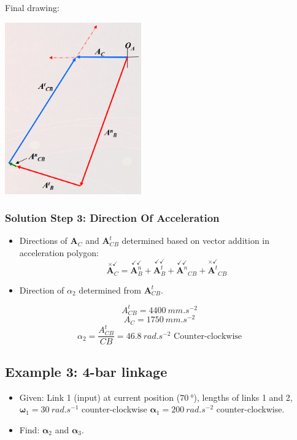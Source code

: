 \documentclass[11pt]{article}
\begin{document}
Final drawing:
\begin{center}
\includegraphics[height=20em]{./images/slider-crank-linkage-graphical-acceleration-analysis-example-2-acceleration-polygon.png}
\end{center}
\subsubsection{Solution Step 3: Direction Of Acceleration}
\label{sec:org64b9114}
\begin{itemize}
\item Directions of \(\boldsymbol{A}_C\) and \(\boldsymbol{A}_{CB}^t\) determined based on vector addition in acceleration polygon:
\[\overset{\times \checkmark}{\boldsymbol{A}_C} = \overset{\checkmark \checkmark}{\boldsymbol{A}_B^n} + \overset{\checkmark \checkmark}{\boldsymbol{A}_B^t} + \overset{\checkmark \checkmark}{\boldsymbol{A}^n}_{CB} + \overset{\times \checkmark}{\boldsymbol{A}^t}_{CB}\]
\item Direction of \(\alpha_2\) determined from \(\boldsymbol{A}_{CB}^t\).
\end{itemize}
\[A_{CB}^t = \qty{4400}{mm.s^{-2}}\]
\[A_C = \qty{1750}{mm.s^{-2}}\]
\[\alpha_2 = \frac{A_{CB}^t}{CB} = \qty{46.8}{rad.s^{-2}} \text{ Counter-clockwise}\]

 \newpage
\subsection{Example 3: 4-bar linkage}
\label{sec:org318dc46}
\begin{itemize}
\item Given: Link 1 (input) at current position (\(\qty{70}{\degree}\)), lengths of links 1 and 2, \(\boldsymbol{\omega}_1 = \qty{30}{rad.s^{-1}}\) counter-clockwise \(\boldsymbol{\alpha}_1 = \qty{200}{rad.s^{-2}}\) counter-clockwise.
\item Find: \(\boldsymbol{\alpha}_2\) and \(\boldsymbol{\alpha}_3\).
\end{itemize}
\end{document}
